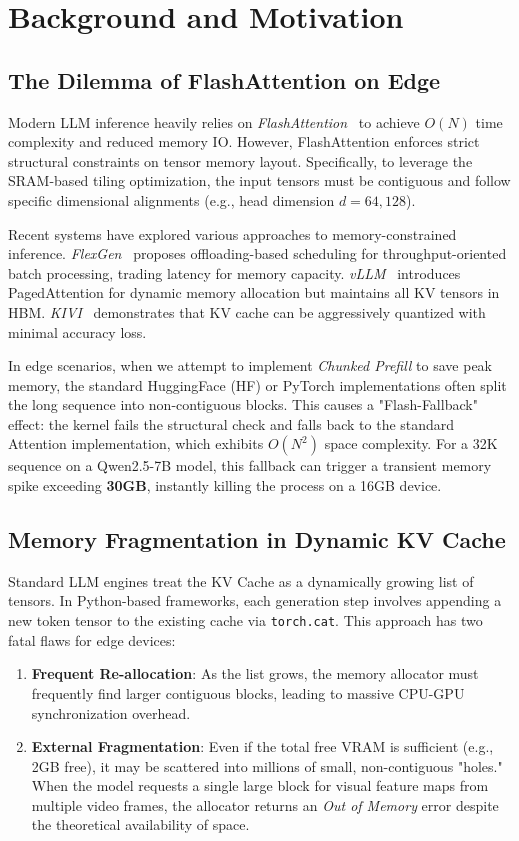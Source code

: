\section{Background and Motivation}
\label{sec:background}

\subsection{The Dilemma of FlashAttention on Edge}
Modern LLM inference heavily relies on \textit{FlashAttention}~\cite{dao2022flashattention} to achieve $O(N)$ time complexity and reduced memory IO. However, FlashAttention enforces strict structural constraints on tensor memory layout. Specifically, to leverage the SRAM-based tiling optimization, the input tensors must be contiguous and follow specific dimensional alignments (e.g., head dimension $d=64, 128$).

Recent systems have explored various approaches to memory-constrained inference. \textit{FlexGen}~\cite{sheng2023flexgen} proposes offloading-based scheduling for throughput-oriented batch processing, trading latency for memory capacity. \textit{vLLM}~\cite{kwon2023efficient} introduces PagedAttention for dynamic memory allocation but maintains all KV tensors in HBM. \textit{KIVI}~\cite{liu2024kivi} demonstrates that KV cache can be aggressively quantized with minimal accuracy loss.

In edge scenarios, when we attempt to implement \textit{Chunked Prefill} to save peak memory, the standard HuggingFace (HF) or PyTorch implementations often split the long sequence into non-contiguous blocks. This causes a "Flash-Fallback" effect: the kernel fails the structural check and falls back to the standard Attention implementation, which exhibits $O(N^2)$ space complexity. For a 32K sequence on a Qwen2.5-7B model, this fallback can trigger a transient memory spike exceeding \textbf{30GB}, instantly killing the process on a 16GB device.

\subsection{Memory Fragmentation in Dynamic KV Cache}
Standard LLM engines treat the KV Cache as a dynamically growing list of tensors. In Python-based frameworks, each generation step involves appending a new token tensor to the existing cache via \texttt{torch.cat}. This approach has two fatal flaws for edge devices:
\begin{enumerate}
    \item \textbf{Frequent Re-allocation}: As the list grows, the memory allocator must frequently find larger contiguous blocks, leading to massive CPU-GPU synchronization overhead.
    \item \textbf{External Fragmentation}: Even if the total free VRAM is sufficient (e.g., 2GB free), it may be scattered into millions of small, non-contiguous "holes." When the model requests a single large block for visual feature maps from multiple video frames, the allocator returns an \textit{Out of Memory} error despite the theoretical availability of space.
\end{enumerate}

